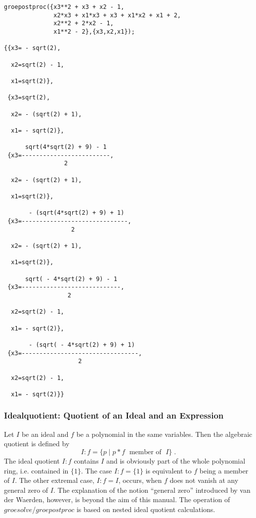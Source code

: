 \begin{verbatim}
groepostproc({x3**2 + x3 + x2 - 1,
              x2*x3 + x1*x3 + x3 + x1*x2 + x1 + 2,
              x2**2 + 2*x2 - 1,
              x1**2 - 2},{x3,x2,x1});

{{x3= - sqrt(2),

  x2=sqrt(2) - 1,

  x1=sqrt(2)},

 {x3=sqrt(2),

  x2= - (sqrt(2) + 1),

  x1= - sqrt(2)},

      sqrt(4*sqrt(2) + 9) - 1
 {x3=-------------------------,
                 2

  x2= - (sqrt(2) + 1),

  x1=sqrt(2)},

       - (sqrt(4*sqrt(2) + 9) + 1)
 {x3=------------------------------,
                   2

  x2= - (sqrt(2) + 1),

  x1=sqrt(2)},

      sqrt( - 4*sqrt(2) + 9) - 1
 {x3=----------------------------,
                  2

  x2=sqrt(2) - 1,

  x1= - sqrt(2)},

       - (sqrt( - 4*sqrt(2) + 9) + 1)
 {x3=---------------------------------,
                     2

  x2=sqrt(2) - 1,

  x1= - sqrt(2)}}
\end{verbatim}

\subsubsection{Idealquotient: Quotient of an Ideal and an Expression}
 
Let $I$ be an ideal and $f$ be a polynomial in the same
variables. Then the algebraic quotient is defined by
\[
I:f = \{ p \;| \; p * f \;\mbox{    member of }\; I\}\;.
\]
The ideal quotient $I:f$ contains $I$ and is obviously part of the
whole polynomial ring, i.e. contained in $\{1\}$. The case $I:f =
\{1\}$ is equivalent to $f$ being a member of  $I$. The other extremal
case, $I:f=I$, occurs, when $f$ does not vanish at any general zero of $I$.
The explanation of the notion ``general zero'' introduced by van der
Waerden, however, is beyond the aim of this manual. The operation
of $groesolve$/$groepostproc$ is based on nested ideal quotient
calculations.

